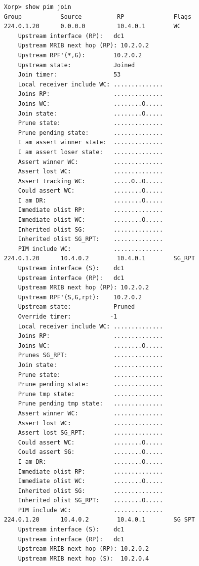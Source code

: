\documentclass[11pt]{report}
\begin{document}
\begin{itemize}
\begin{verbatim}
Xorp> show pim join 
Group           Source          RP              Flags
224.0.1.20      0.0.0.0         10.4.0.1        WC   
    Upstream interface (RP):   dc1
    Upstream MRIB next hop (RP): 10.2.0.2
    Upstream RPF'(*,G):        10.2.0.2
    Upstream state:            Joined 
    Join timer:                53
    Local receiver include WC: ..............
    Joins RP:                  ..............
    Joins WC:                  ........O.....
    Join state:                ........O.....
    Prune state:               ..............
    Prune pending state:       ..............
    I am assert winner state:  ..............
    I am assert loser state:   ..............
    Assert winner WC:          ..............
    Assert lost WC:            ..............
    Assert tracking WC:        .....O..O.....
    Could assert WC:           ........O.....
    I am DR:                   ........O.....
    Immediate olist RP:        ..............
    Immediate olist WC:        ........O.....
    Inherited olist SG:        ..............
    Inherited olist SG_RPT:    ..............
    PIM include WC:            ..............
224.0.1.20      10.4.0.2        10.4.0.1        SG_RPT 
    Upstream interface (S):    dc1
    Upstream interface (RP):   dc1
    Upstream MRIB next hop (RP): 10.2.0.2
    Upstream RPF'(S,G,rpt):    10.2.0.2
    Upstream state:            Pruned 
    Override timer:           -1
    Local receiver include WC: ..............
    Joins RP:                  ..............
    Joins WC:                  ........O.....
    Prunes SG_RPT:             ..............
    Join state:                ..............
    Prune state:               ..............
    Prune pending state:       ..............
    Prune tmp state:           ..............
    Prune pending tmp state:   ..............
    Assert winner WC:          ..............
    Assert lost WC:            ..............
    Assert lost SG_RPT:        ..............
    Could assert WC:           ........O.....
    Could assert SG:           ........O.....
    I am DR:                   ........O.....
    Immediate olist RP:        ..............
    Immediate olist WC:        ........O.....
    Inherited olist SG:        ..............
    Inherited olist SG_RPT:    ........O.....
    PIM include WC:            ..............
224.0.1.20      10.4.0.2        10.4.0.1        SG SPT 
    Upstream interface (S):    dc1
    Upstream interface (RP):   dc1
    Upstream MRIB next hop (RP): 10.2.0.2
    Upstream MRIB next hop (S):  10.2.0.4

\end{verbatim}
\end{itemize}
\end{document}
